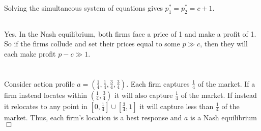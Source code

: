 \documentclass{article}
\begin{document}
\subsection{}
Solving the simultaneous system of equations gives $p_1^* = p_2^* = c+1$.
\subsection{}
Yes. In the Nash equilibrium, both firms face a price of 1 and make a profit of 1. So if the firms collude and set their prices equal to some $p \gg c$, then they will each make profit $p-c \gg 1$.

\section{}
\subsection{}
Consider action profile $a = (\frac{1}{4},\frac{1}{4},\frac{3}{4},\frac{3}{4})$. Each firm captures $\frac{1}{4}$ of the market. If a firm instead locates within $(\frac{1}{4},\frac{3}{4})$ it will also capture $\frac{1}{4}$ of the market. If instead it relocates to any point in $[0,\frac{1}{4}] \cup [\frac{3}{4},1]$ it will capture less than $\frac{1}{4}$ of the market. Thus, each firm's location is a best response and $a$ is a Nash equilibrium $\Box$
\end{document}
